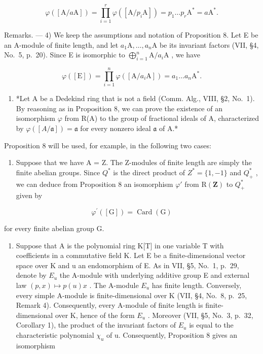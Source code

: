 \[
\varphi ([ \mathrm{A} / a \mathrm{A} ]) = \prod_ {i = 1} ^ {r} \varphi ([ \mathrm{A} / p _ {i} \mathrm{A} ]) = p _ {1} \dots p _ {r} \mathrm{A} ^ {*} = a \mathrm{A} ^ {*}.
\]

Remarks. --- 4) We keep the assumptions and notation of Proposition 8. Let E be an A-module of finite length, and let \(a_{1}\mathrm{A},\ldots ,a_{n}\mathrm{A}\) be its invariant factors (VII, §4, No.~5, p.~20). Since E is isomorphic to \(\bigoplus_{i = 1}^{n}\mathrm{A} / a_i\mathrm{A}\) , we have

\[
\varphi ([ \mathrm{E} ]) = \prod_ {i = 1} ^ {n} \varphi ([ \mathrm{A} / a _ {i} \mathrm{A} ]) = a _ {1} \dots a _ {n} \mathrm{A} ^ {*}.\tag{10}
\]

\begin{enumerate}
\def\labelenumi{\arabic{enumi})}
\setcounter{enumi}{4}
\tightlist
\item
  *Let A be a Dedekind ring that is not a field (Comm. Alg., VIII, §2, No.~1). By reasoning as in Proposition 8, we can prove the existence of an isomorphism \(\varphi\) from R(A) to the group of fractional ideals of A, characterized by \(\varphi([A/\mathfrak{a}]) = \mathfrak{a}\) for every nonzero ideal \(\mathfrak{a}\) of A.*
\end{enumerate}

Proposition 8 will be used, for example, in the following two cases:

\begin{enumerate}
\def\labelenumi{\alph{enumi})}
\tightlist
\item
  Suppose that we have A = Z. The Z-modules of finite length are simply the finite abelian groups. Since \(Q^{*}\) is the direct product of \(Z^{*} = \{1, -1\}\) and \(Q_{+}^{*}\) , we can deduce from Proposition 8 an isomorphism \(\varphi'\) from \(\mathrm{R}(\mathbf{Z})\) to \(Q_{+}^{*}\) given by
\end{enumerate}

\[
\varphi^ {\prime} ([ \mathrm{G} ]) = \operatorname{Card} (\mathrm{G})
\]

for every finite abelian group G.

\begin{enumerate}
\def\labelenumi{\alph{enumi})}
\setcounter{enumi}{1}
\tightlist
\item
  Suppose that A is the polynomial ring K{[}T{]} in one variable T with coefficients in a commutative field K. Let E be a finite-dimensional vector space over K and u an endomorphism of E. As in VII, §5, No.~1, p.~29, denote by \(E_{u}\) the A-module with underlying additive group E and external law \((p, x) \mapsto p(u)x\) . The A-module \(E_{u}\) has finite length. Conversely, every simple A-module is finite-dimensional over K (VII, §4, No.~8, p.~25, Remark 4). Consequently, every A-module of finite length is finite-dimensional over K, hence of the form \(E_{u}\) . Moreover (VII, §5, No.~3, p.~32, Corollary 1), the product of the invariant factors of \(E_{u}\) is equal to the characteristic polynomial \(\chi_{u}\) of u. Consequently, Proposition 8 gives an isomorphism
\end{enumerate}

